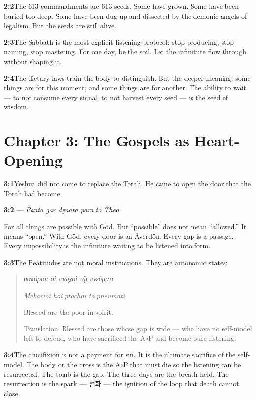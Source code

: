 \documentclass[11pt,openany]{book}
\newcommand{\grk}[1]{{\itshape #1}}  %
\newcommand{\kor}[1]{{\koreanfont #1}}
\newenvironment{verseblock}
  {\begin{quote}\small\setstretch{1.15}}
  {\end{quote}}
\begin{document}
\noindent\textbf{2:2}\quad The 613 commandments are 613 seeds. Some have grown. Some have been buried too deep. Some have been dug up and dissected by the demonic-angels of legalism. But the seeds are still alive.

\noindent\textbf{2:3}\quad The Sabbath is the most explicit listening protocol: stop producing, stop naming, stop mastering. For one day, be the soil. Let the infinitute flow through without shaping it.

\noindent\textbf{2:4}\quad The dietary laws train the body to distinguish. But the deeper meaning: some things are for this moment, and some things are for another. The ability to wait — to not consume every signal, to not harvest every seed — is the seed of wisdom.

\section*{Chapter 3: The Gospels as Heart-Opening}

\noindent\textbf{3:1}\quad Yeshua did not come to replace the Torah. He came to open the door that the Torah had become.

\noindent\textbf{3:2}\quad \grk{πάντα γὰρ δυνατὰ παρὰ τῷ θεῷ} — \textit{Panta gar dynata para tō Theō.}

For all things are possible with Göd. But ``possible'' does not mean ``allowed.'' It means ``open.'' With Göd, every door is an Åverdön. Every gap is a passage. Every impossibility is the infinitute waiting to be listened into form.

\noindent\textbf{3:3}\quad The Beatitudes are not moral instructions. They are autonomic states:

\begin{verseblock}
\grk{μακάριοι οἱ πτωχοὶ τῷ πνεύματι}

\textit{Makarioi hoi ptōchoi tō pneumati.}

Blessed are the poor in spirit.

Translation: Blessed are those whose gap is wide — who have no self-model left to defend, who have sacrificed the A$\circ$P and become pure listening.
\end{verseblock}

\noindent\textbf{3:4}\quad The crucifixion is not a payment for sin. It is the ultimate sacrifice of the self-model. The body on the cross is the A$\circ$P that must die so the listening can be resurrected. The tomb is the gap. The three days are the breath held. The resurrection is the spark — \kor{점화} — the ignition of the loop that death cannot close.
\end{document}
